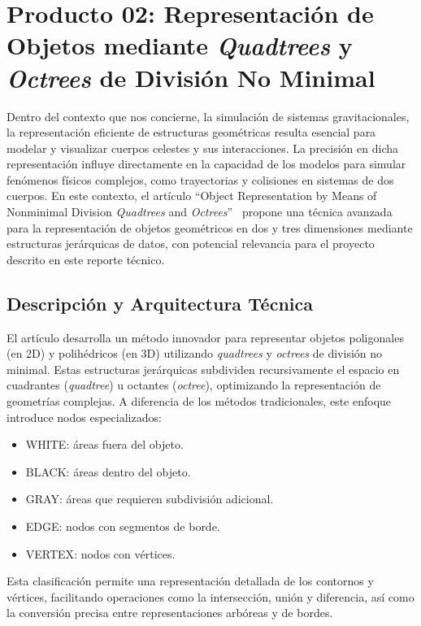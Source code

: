 \section[Representación de Objetos]{Producto 02: Representación de Objetos mediante \textit{Quadtrees} y \textit{Octrees} de División No Minimal}%
\label{sec:state_of_the_art_02}

Dentro del contexto que nos concierne, la simulación de sistemas gravitacionales, la representación eficiente de estructuras geométricas resulta esencial para modelar y visualizar cuerpos celestes y sus interacciones. La precisión en dicha representación influye directamente en la capacidad de los modelos para simular fenómenos físicos complejos, como trayectorias y colisiones en sistemas de dos cuerpos. En este contexto, el artículo ``Object Representation by Means of Nonminimal Division \textit{Quadtrees} and \textit{Octrees}''~\cite{Ayala1985} propone una técnica avanzada para la representación de objetos geométricos en dos y tres dimensiones mediante estructuras jerárquicas de datos, con potencial relevancia para el proyecto descrito en este reporte técnico.

\subsection{Descripción y Arquitectura Técnica}

El artículo desarrolla un método innovador para representar objetos poligonales (en 2D) y polihédricos (en 3D) utilizando \textit{quadtrees} y \textit{octrees} de división no minimal. Estas estructuras jerárquicas subdividen recursivamente el espacio en cuadrantes (\textit{quadtree}) u octantes (\textit{octree}), optimizando la representación de geometrías complejas. A diferencia de los métodos tradicionales, este enfoque introduce nodos especializados:
\begin{itemize}
    \item \textsc{WHITE}: áreas fuera del objeto.
    \item \textsc{BLACK}: áreas dentro del objeto.
    \item \textsc{GRAY}: áreas que requieren subdivisión adicional.
    \item \textsc{EDGE}: nodos con segmentos de borde.
    \item \textsc{VERTEX}: nodos con vértices.
\end{itemize}
Esta clasificación permite una representación detallada de los contornos y vértices, facilitando operaciones como la intersección, unión y diferencia, así como la conversión precisa entre representaciones arbóreas y de bordes.

